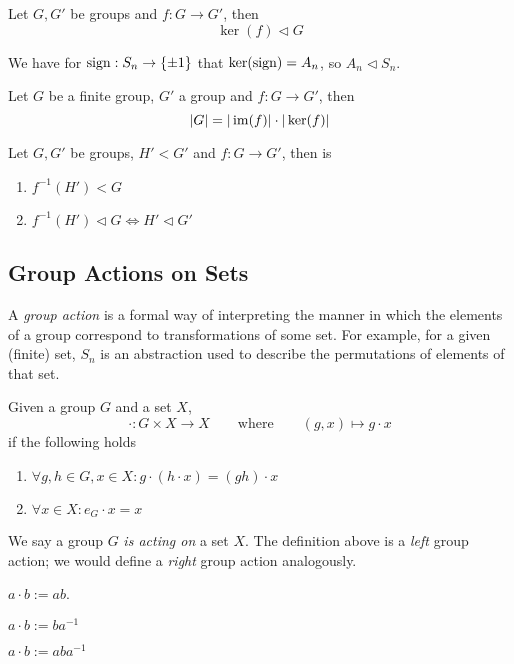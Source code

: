 \begin{proposition}\label{pro:ker_subgrp}
   Let \(G, G'\) be groups and \(f: G \to G'\), then
   \[\ker(f) \triangleleft G\]
\end{proposition}
\begin{example}
   We have for \(\operatorname{sign}: S_n \to \{\pm 1\}\) that \(\ker(\operatorname{sign}) = A_n\), so \(A_n \triangleleft S_n\).
\end{example}

\begin{corollary}
   Let \(G\) be a finite group, \(G'\) a group and \(f: G \to G'\), then
   \[|G| = |\operatorname{im}(f)| \cdot |\ker(f)|\]
\end{corollary}

\begin{proposition}
   Let \(G, G'\) be groups, \(H' < G'\) and \(f: G \to G'\), then is
   \begin{enumerate}[label=\roman*, align=Center]
      \item \(f^{-1}(H') < G\)
      \item \(f^{-1}(H') \triangleleft G \iff H' \triangleleft G'\)
   \end{enumerate}
\end{proposition}

\subsection{Group Actions on Sets}
A \emph{group action} is a formal way of interpreting the manner in which the elements of a group correspond to transformations of some set.
For example, for a given (finite) set, \(S_n\) is an abstraction used to describe the permutations of elements of that set.

\begin{definition}
   Given a group \(G\) and a set \(X\),
   \[\cdot: G \times X \to X \qquad\text{where}\qquad (g, x) \mapsto g \cdot x\]
   if the following holds
   \begin{enumerate}[label=\roman*, align=Center]
      \item \(\forall g, h \in G, x \in X: g \cdot (h \cdot x) = (gh) \cdot x\)
      \item \(\forall x \in X: e_G \cdot x = x\)
   \end{enumerate}
\end{definition}
\begin{remark}
   We say a group \(G\) \emph{is acting on} a set \(X\).
   The definition above is a \emph{left} group action; we would define a \emph{right} group action analogously.
\end{remark}
\begin{example}
   \(a \cdot b := ab\).
\end{example}
\begin{example}
   \(a \cdot b := ba^{-1}\)
\end{example}
\begin{example}[Conjugation]
   \(a \cdot b := aba^{-1}\)
\end{example}


